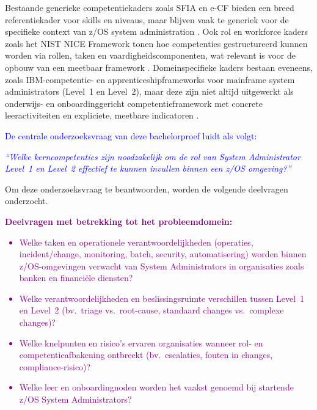Bestaande generieke competentiekaders zoals SFIA en e-CF bieden een breed referentiekader voor skills en niveaus, maar blijven vaak te generiek voor de specifieke context van z/OS system administration \autocite{SFIA9,eCF2020}. 
Ook rol en workforce kaders zoals het NIST NICE Framework tonen hoe competenties gestructureerd kunnen worden via rollen, taken en vaardigheidscomponenten, wat relevant is voor de opbouw van een meetbaar framework \autocite{NISTNICE800181r1}. 
Domeinspecifieke kaders bestaan eveneens, zoals IBM-competentie- en apprenticeshipframeworks voor mainframe system administrators (Level~1 en Level~2), maar deze zijn niet altijd uitgewerkt als onderwijs- en onboardinggericht competentieframework met concrete leeractiviteiten en expliciete, meetbare indicatoren \autocite{IBMZSysAdminLevel1,IBMZSysAdminLevel2}.

\textcolor{blue}{De centrale onderzoeksvraag van deze bachelorproef luidt als volgt:}

\textcolor{blue}{\textit{“Welke kerncompetenties zijn noodzakelijk om de rol van System Administrator Level~1 en Level~2 effectief te kunnen invullen binnen een z/OS omgeving?”}}

Om deze onderzoeksvraag te beantwoorden, worden de volgende deelvragen onderzocht.

\textcolor{purple}{\textbf{Deelvragen met betrekking tot het probleemdomein:}}
\textcolor{purple}{
	\begin{itemize}
	\item Welke taken en operationele verantwoordelijkheden (operaties, incident/change, monitoring, batch, security, automatisering) worden binnen z/OS-omgevingen verwacht van System Administrators in organisaties zoals banken en financiële diensten?
	\item Welke verantwoordelijkheden en beslissingsruimte verschillen tussen Level~1 en Level~2 (bv.\ triage vs.\ root-cause, standaard changes vs.\ complexe changes)?
    \item Welke knelpunten en risico's ervaren organisaties wanneer rol- en competentieafbakening ontbreekt (bv.\ escalaties, fouten in changes, compliance-risico)?
    \item Welke leer en onboardingnoden worden het vaakst genoemd bij startende z/OS System Administrators?
\end{itemize}
}

